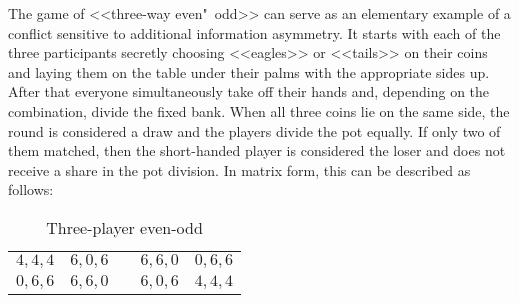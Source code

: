 The game of <<three-way even"~odd>> can serve as an elementary example of a conflict sensitive to additional information asymmetry. It starts with each of the three participants secretly choosing <<eagles>> or <<tails>> on their coins and laying them on the table under their palms with the appropriate sides up. After that everyone simultaneously take off their hands and, depending on the combination, divide the fixed bank. When all three coins lie on the same side, the round is considered a draw and the players divide the pot equally. If only two of them matched, then the short-handed player is considered the loser and does not receive a share in the pot division. In matrix form, this can be described as follows: %
\begin{table} [htbp]
	\centering
	\begin{threeparttable}
		\caption{Three-player even-odd}
		\label{tab:coin3}
		\begin{tabular}{ |c|c|c|c|c| }
			\cline{1-2} \cline{4-5}
			\rule[-7pt]{0pt}{2em}$4, 4, 4$ &
			\rule[-7pt]{0pt}{2em}$6, 0, 6$ & \qquad\qquad\qquad &
			\rule[-7pt]{0pt}{2em}$6, 6, 0$ &
			\rule[-7pt]{0pt}{2em}$0, 6, 6$ \\
			\cline{1-2} \cline{4-5}
			\rule[-7pt]{0pt}{2em}$0, 6, 6$ &
			\rule[-7pt]{0pt}{2em}$6, 6, 0$ & \qquad\qquad\qquad &
			\rule[-7pt]{0pt}{2em}$6, 0, 6$ &
			\rule[-7pt]{0pt}{2em}$4, 4, 4$ \\
			\cline{1-2} \cline{4-5}
		\end{tabular}
	\end{threeparttable}
\end{table}

